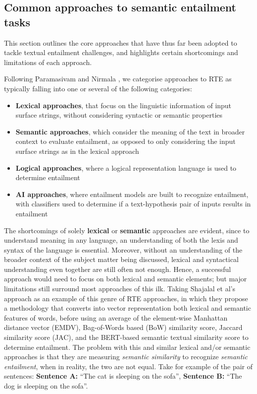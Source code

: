 \documentclass[12pt,twoside]{report}
\begin{document}
\subsection{Common approaches to semantic entailment tasks}

This section outlines the core approaches that have thus far been adopted to tackle textual entailment challenges, and highlights certain shortcomings and limitations of each approach. \newline \par

Following Paramasivam and Nirmala \cite{PARAMASIVAM20229644}, we categorise approaches to RTE as typically falling into one or several of the following categories:
\begin{itemize}[itemsep=0pt]
    \item \textbf{Lexical approaches}, that focus on the linguistic information of input surface strings, without considering syntactic or semantic properties
    \item \textbf{Semantic approaches}, which consider the meaning of the text in broader context to evaluate entailment, as opposed to only considering the input surface strings as in the lexical approach
    \item \textbf{Logical approaches}, where a logical representation language is used to determine entailment
    \item \textbf{AI approaches}, where entailment models are built to recognize entailment, with classifiers used to determine if a text-hypothesis pair of inputs results in entailment 
\end{itemize}

The shortcomings of solely \textbf{lexical} or \textbf{semantic} approaches are evident, since to understand meaning in any language, an understanding of both the lexis and syntax of the language is essential. Moreover, without an understanding of the broader context of the subject matter being discussed, lexical and syntactical understanding even together are still often not enough. Hence, a successful approach would need to focus on both lexical and semantic elements; but major limitations still surround most approaches of this ilk. Taking Shajalal et al's \cite{shajalal} approach as an example of this genre of RTE approaches, in which they propose a methodology that converts into vector representation both lexical and semantic features of words, before using an average of the element-wise Manhattan distance vector (EMDV), Bag-of-Words based (BoW) similarity score, Jaccard similarity score (JAC), and the BERT-based semantic textual similarity score to determine entailment. The problem with this and similar lexical and/or semantic approaches is that they are measuring \textit{semantic similarity} to recognize \textit{semantic entailment}, when in reality, the two are not equal. Take for example of the pair of sentences: \textbf{Sentence A:} ``The cat is sleeping on the sofa'', \textbf{Sentence B:} ``The dog is sleeping on the sofa''. \newline \par
\end{document}
